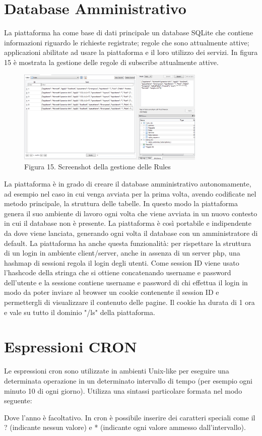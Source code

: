\section{Database Amministrativo}
La piattaforma ha come base di dati principale un database SQLite che contiene informazioni riguardo le richieste registrate; regole che sono attualmente attive; applicazioni abilitate ad usare la piattaforma e il loro utilizzo dei servizi.
In figura 15 è mostrata la gestione delle regole di subscribe attualmente attive.
\begin{figure}[h]
	\centering
	\includegraphics[width=0.8\textwidth]{db-rules.png}
	\caption*{Figura 15. Screenshot della gestione delle Rules}
\end{figure}
\clearpage
La piattaforma è in grado di creare il database amministrativo autonomamente, ad esempio nel caso in cui venga avviata per la prima volta, avendo codificate nel metodo principale, la struttura delle tabelle. In questo modo la piattaforma genera il suo ambiente di lavoro ogni volta che viene avviata in un nuovo contesto in cui il database non è presente. La piattaforma è così portabile e indipendente da dove viene lanciata, generando ogni volta il database con un amministratore di default.
La piattaforma ha anche questa funzionalità: per rispettare la struttura di un login in ambiente client/server, anche in assenza di un server php, una hashmap di sessioni regola il login degli utenti. Come session ID viene usato l’hashcode della stringa che si ottiene concatenando username e password dell'utente e la sessione contiene username e password di chi effettua il login in modo da poter inviare al browser un cookie contenente il session ID e permettergli di visualizzare il contenuto delle pagine. Il cookie ha durata di 1 ora e vale su tutto il dominio "/ls" della piattaforma.

\section{Espressioni CRON}
Le espressioni cron sono utilizzate in ambienti Unix-like per eseguire una determinata operazione in un determinato intervallo di tempo (per esempio ogni minuto 10 di ogni giorno). Utilizza una sintassi particolare formata nel modo seguente:
\begin{center}
	{\selectfont
		
	}
\end{center}
Dove l’anno è facoltativo. In cron è possibile inserire dei caratteri speciali come il ? (indicante nessun valore) e * (indicante ogni valore ammesso dall’intervallo).

